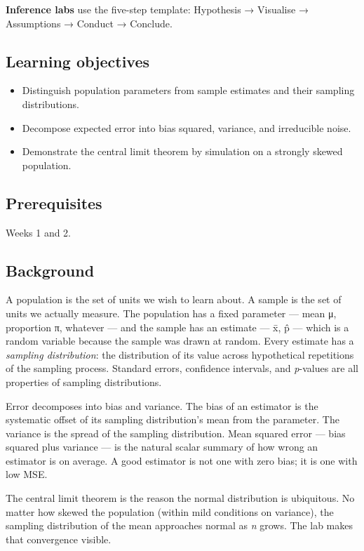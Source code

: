 \documentclass[
]{article}
\author{}
\date{\vspace{-2.5em}}
\providecommand{\tightlist}{%
  \setlength{\itemsep}{0pt}\setlength{\parskip}{0pt}}
\begin{document}
\textbf{Inference labs} use the five-step template: Hypothesis →
Visualise → Assumptions → Conduct → Conclude.

\subsection{Learning objectives}\label{learning-objectives}

\begin{itemize}
\tightlist
\item
  Distinguish population parameters from sample estimates and their
  sampling distributions.
\item
  Decompose expected error into bias squared, variance, and irreducible
  noise.
\item
  Demonstrate the central limit theorem by simulation on a strongly
  skewed population.
\end{itemize}

\subsection{Prerequisites}\label{prerequisites}

Weeks 1 and 2.

\subsection{Background}\label{background}

A population is the set of units we wish to learn about. A sample is the
set of units we actually measure. The population has a fixed parameter
--- mean μ, proportion π, whatever --- and the sample has an estimate
--- x̄, p̂ --- which is a random variable because the sample was drawn at
random. Every estimate has a \emph{sampling distribution}: the
distribution of its value across hypothetical repetitions of the
sampling process. Standard errors, confidence intervals, and
\emph{p}-values are all properties of sampling distributions.

Error decomposes into bias and variance. The bias of an estimator is the
systematic offset of its sampling distribution's mean from the
parameter. The variance is the spread of the sampling distribution. Mean
squared error --- bias squared plus variance --- is the natural scalar
summary of how wrong an estimator is on average. A good estimator is not
one with zero bias; it is one with low MSE.

The central limit theorem is the reason the normal distribution is
ubiquitous. No matter how skewed the population (within mild conditions
on variance), the sampling distribution of the mean approaches normal as
\emph{n} grows. The lab makes that convergence visible.
\end{document}
